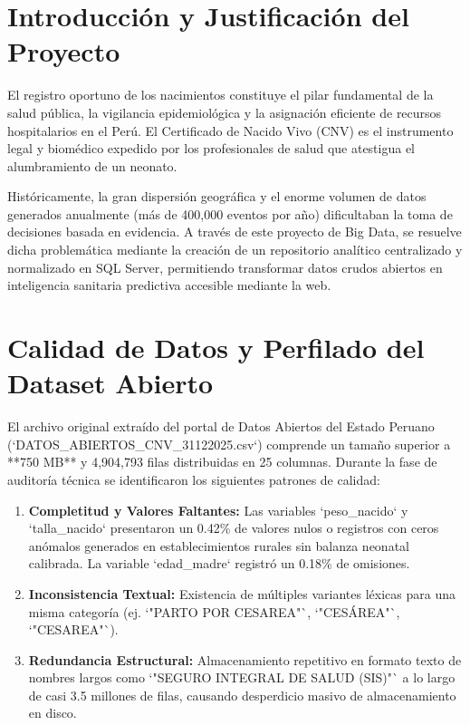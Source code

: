 \documentclass[12pt,a4paper]{article}
\begin{document}
\section{Introducción y Justificación del Proyecto}

El registro oportuno de los nacimientos constituye el pilar fundamental de la salud pública, la vigilancia epidemiológica y la asignación eficiente de recursos hospitalarios en el Perú. El Certificado de Nacido Vivo (CNV) es el instrumento legal y biomédico expedido por los profesionales de salud que atestigua el alumbramiento de un neonato.

Históricamente, la gran dispersión geográfica y el enorme volumen de datos generados anualmente (más de 400,000 eventos por año) dificultaban la toma de decisiones basada en evidencia. A través de este proyecto de Big Data, se resuelve dicha problemática mediante la creación de un repositorio analítico centralizado y normalizado en SQL Server, permitiendo transformar datos crudos abiertos en inteligencia sanitaria predictiva accesible mediante la web.

\section{Calidad de Datos y Perfilado del Dataset Abierto}

El archivo original extraído del portal de Datos Abiertos del Estado Peruano (`DATOS_ABIERTOS_CNV_31122025.csv`) comprende un tamaño superior a **750 MB** y 4,904,793 filas distribuidas en 25 columnas. Durante la fase de auditoría técnica se identificaron los siguientes patrones de calidad:

\begin{enumerate}
    \item \textbf{Completitud y Valores Faltantes:} Las variables `peso_nacido` y `talla_nacido` presentaron un 0.42\% de valores nulos o registros con ceros anómalos generados en establecimientos rurales sin balanza neonatal calibrada. La variable `edad_madre` registró un 0.18\% de omisiones.
    \item \textbf{Inconsistencia Textual:} Existencia de múltiples variantes léxicas para una misma categoría (ej. `"PARTO POR CESAREA"`, `"CESÁREA"`, `"CESAREA"`).
    \item \textbf{Redundancia Estructural:} Almacenamiento repetitivo en formato texto de nombres largos como `"SEGURO INTEGRAL DE SALUD (SIS)"` a lo largo de casi 3.5 millones de filas, causando desperdicio masivo de almacenamiento en disco.
\end{enumerate}
\end{document}
